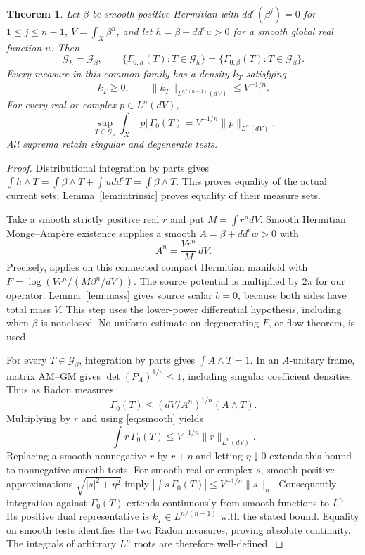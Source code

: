 \documentclass[11pt]{article}
\newcommand{\ddc}{dd^c}
\newcommand{\Ga}{\mathcal G}
\newtheorem{theorem}{Theorem}
\theoremstyle{remark}\newtheorem{remark}[theorem]{Remark}
\begin{document}
\begin{theorem}\label{th:profile}
Let $\beta$ be smooth positive Hermitian with
$\ddc(\beta^j)=0$ for $1\leq j\leq n-1$,
$V=\int_X\beta^n$, and let $h=\beta+\ddc u>0$ for a smooth
global real function $u$. Then
\[
 \Ga_h=\Ga_\beta,\qquad
 \{\Gamma_{0,h}(T):T\in\Ga_h\}
 =\{\Gamma_{0,\beta}(T):T\in\Ga_\beta\}.
\]
Every measure in this common family has a density $k_T$ satisfying
\[
 k_T\geq0,\qquad
 \|k_T\|_{L^{n/(n-1)}(dV)}\leq V^{-1/n}.
\]
For every real or complex $p\in L^n(dV)$,
\begin{equation}\label{eq:profile}
 \sup_{T\in\Ga_h}\int_X|p|\,\Gamma_0(T)
       =V^{-1/n}\|p\|_{L^n(dV)}.
\end{equation}
All suprema retain singular and degenerate tests.
\end{theorem}
\begin{proof}
Distributional integration by parts gives
$\int h\wedge T=\int\beta\wedge T+\int u\ddc T
=\int\beta\wedge T$. This proves equality of the actual current
sets; Lemma~\ref{lem:intrinsic} proves equality of their measure sets.

Take a smooth strictly positive real $r$ and put $M=\int r^n dV$.
Smooth Hermitian Monge--Amp\`ere existence supplies a smooth
$A=\beta+\ddc w>0$ with
\begin{equation}\label{eq:smooth}
 A^n=\frac{Vr^n}{M}\,dV.
\end{equation}
Precisely, \cite[Corollary 1]{TW} applies on this connected compact
Hermitian manifold with
$F=\log(Vr^n/(M\beta^n/dV))$. The source potential is multiplied
by $2\pi$ for our operator. Lemma~\ref{lem:mass} gives source scalar
$b=0$, because both sides have total mass $V$. This step uses the
lower-power differential hypothesis, including when $\beta$ is nonclosed.
No uniform estimate on degenerating $F$, or flow theorem, is used.

For every $T\in\Ga_\beta$, integration by parts gives
$\int A\wedge T=1$. In an $A$-unitary frame, matrix AM--GM gives
$\det(P_A)^{1/n}\leq1$, including singular coefficient densities.
Thus as Radon measures
\[
 \Gamma_0(T)\leq
       (dV/A^n)^{1/n}(A\wedge T).
\]
Multiplying by $r$ and using \eqref{eq:smooth} yields
\begin{equation}\label{eq:dualbound}
 \int r\,\Gamma_0(T)\leq V^{-1/n}\|r\|_{L^n(dV)}.
\end{equation}
Replacing a smooth nonnegative $r$ by $r+\eta$ and letting
$\eta\downarrow0$ extends this bound to nonnegative smooth tests.
For smooth real or complex $s$, smooth positive approximations
$\sqrt{|s|^2+\eta^2}$ imply
$|\int s\,\Gamma_0(T)|\leq V^{-1/n}\|s\|_n$.
Consequently integration against $\Gamma_0(T)$ extends continuously
from smooth functions to $L^n$. Its positive dual representative is
$k_T\in L^{n/(n-1)}$ with the stated bound. Equality on smooth
tests identifies the two Radon measures, proving absolute continuity.
The integrals of arbitrary $L^n$ roots are therefore well-defined.


\end{proof}
\end{document}
